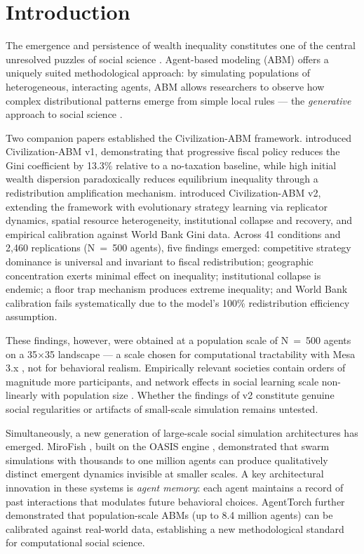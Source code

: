 \documentclass[12pt, letterpaper]{article}
\begin{document}
\section{Introduction}

The emergence and persistence of wealth inequality constitutes one of
the central unresolved puzzles of social science \citep{atkinson2015,
piketty2014}. Agent-based modeling (ABM) offers a uniquely suited
methodological approach: by simulating populations of heterogeneous,
interacting agents, ABM allows researchers to observe how complex
distributional patterns emerge from simple local rules --- the
\emph{generative} approach to social science \citep{epstein1996,
axelrod1997}.

Two companion papers established the Civilization-ABM framework.
\citet{delaserna2024v1} introduced Civilization-ABM v1, demonstrating
that progressive fiscal policy reduces the Gini coefficient by 13.3\%
relative to a no-taxation baseline, while high initial wealth dispersion
paradoxically reduces equilibrium inequality through a redistribution
amplification mechanism. \citet{delaserna2025v2} introduced
Civilization-ABM v2, extending the framework with evolutionary strategy
learning via replicator dynamics, spatial resource heterogeneity,
institutional collapse and recovery, and empirical calibration against
World Bank Gini data. Across 41 conditions and 2,460 replications
(N~=~500 agents), five findings emerged: competitive strategy dominance
is universal and invariant to fiscal redistribution; geographic
concentration exerts minimal effect on inequality; institutional
collapse is endemic; a floor trap mechanism produces extreme inequality;
and World Bank calibration fails systematically due to the model's 100\%
redistribution efficiency assumption.

These findings, however, were obtained at a population scale of
N~=~500 agents on a 35$\times$35 landscape --- a scale chosen for
computational tractability with Mesa 3.x \citep{masad2015mesa}, not for
behavioral realism. Empirically relevant societies contain orders of
magnitude more participants, and network effects in social learning scale
non-linearly with population size \citep{barabasi1999}. Whether the
findings of v2 constitute genuine social regularities or artifacts of
small-scale simulation remains untested.

Simultaneously, a new generation of large-scale social simulation
architectures has emerged. MiroFish \citep{mirofish2025}, built on the
OASIS engine \citep{yang2024oasis}, demonstrated that swarm simulations
with thousands to one million agents can produce qualitatively distinct
emergent dynamics invisible at smaller scales. A key architectural
innovation in these systems is \emph{agent memory}: each agent maintains
a record of past interactions that modulates future behavioral choices.
AgentTorch \citep{chopra2024agenttorch} further demonstrated that
population-scale ABMs (up to 8.4 million agents) can be calibrated
against real-world data, establishing a new methodological standard for
computational social science.
\end{document}
